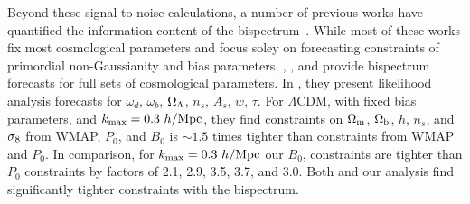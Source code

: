 Beyond these signal-to-noise calculations, a number of previous works 
have quantified the information content of the bispectrum~\citep{scoccimarro2004, sefusatti2006, sefusatti2007, song2015, tellarini2016, yamauchi2017a, karagiannis2018, yankelevich2019, chudaykin2019}. 
While most of these works fix most cosmological parameters and focus soley 
on forecasting constraints of primordial non-Gaussianity and bias parameters, 
\cite{sefusatti2006}, \cite{yankelevich2019}, and \cite{chudaykin2019} provide 
bispectrum forecasts for full sets of cosmological parameters. In \cite{sefusatti2006}, 
they present likelihood analysis forecasts for $\omega_d$, $\omega_b$, $\Omega_\Lambda$, 
$n_s$, $A_s$, $w$, $\tau$. %
For $\Lambda$CDM, with fixed bias parameters, and $k_{\rm max} = 0.3~h/{\rm Mpc}$, 
they find constraints on $\Omega_{\rm m}$, $\Omega_{\rm b}$, $h$, $n_s$, and $\sigma_8$ from WMAP, 
$P_0$, and $B_0$ is $\sim 1.5$ times tighter than constraints from WMAP 
and $P_0$. In comparison, for 
$k_{\rm max} = 0.3~h/{\rm Mpc}$ our $B_0$, constraints are tighter than $P_0$ constraints 
by factors of 2.1, 2.9, 3.5, 3.7, and 3.0. Both \cite{sefusatti2006} and our 
analysis find significantly tighter constraints with the bispectrum. 

